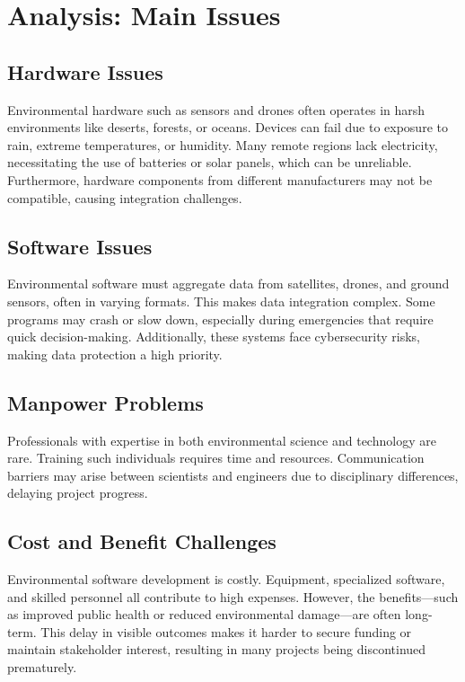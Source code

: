 \documentclass[12pt, a4paper]{article} %
\begin{document}
\section{Analysis: Main Issues}

\subsection{Hardware Issues}
Environmental hardware such as sensors and drones often operates in harsh environments like deserts, forests, or oceans. Devices can fail due to exposure to rain, extreme temperatures, or humidity. Many remote regions lack electricity, necessitating the use of batteries or solar panels, which can be unreliable. Furthermore, hardware components from different manufacturers may not be compatible, causing integration challenges.

\subsection{Software Issues}
Environmental software must aggregate data from satellites, drones, and ground sensors, often in varying formats. This makes data integration complex. Some programs may crash or slow down, especially during emergencies that require quick decision-making. Additionally, these systems face cybersecurity risks, making data protection a high priority.

\subsection{Manpower Problems}
Professionals with expertise in both environmental science and technology are rare. Training such individuals requires time and resources. Communication barriers may arise between scientists and engineers due to disciplinary differences, delaying project progress.

\subsection{Cost and Benefit Challenges}
Environmental software development is costly. Equipment, specialized software, and skilled personnel all contribute to high expenses. However, the benefits—such as improved public health or reduced environmental damage—are often long-term. This delay in visible outcomes makes it harder to secure funding or maintain stakeholder interest, resulting in many projects being discontinued prematurely.
\end{document}

